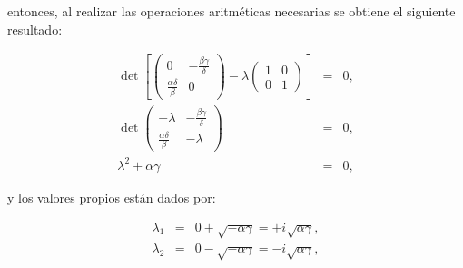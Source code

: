 \documentclass[letterpaper,11pt]{article}
\begin{document}
entonces, al realizar las operaciones aritm\'{e}ticas necesarias se obtiene
el siguiente resultado:

\begin{eqnarray*}
\det \left[ \left( 
\begin{array}{cc}
0 & -\frac{\beta \gamma }{\delta } \\ 
\frac{\alpha \delta }{\beta } & 0%
\end{array}%
\right) -\lambda \left( 
\begin{array}{cc}
1 & 0 \\ 
0 & 1%
\end{array}%
\right) \right]  &=&0, \\
\det \left( 
\begin{array}{cc}
-\lambda  & -\frac{\beta \gamma }{\delta } \\ 
\frac{\alpha \delta }{\beta } & -\lambda 
\end{array}%
\right)  &=&0, \\
\lambda ^{2}+\alpha \gamma  &=&0,
\end{eqnarray*}

y los valores propios est\'{a}n dados por:

\begin{eqnarray*}
\lambda _{1} &=&0+\sqrt{-\alpha \gamma }=+i\sqrt{\alpha \gamma }, \\
\lambda _{2} &=&0-\sqrt{-\alpha \gamma }=-i\sqrt{\alpha \gamma },
\end{eqnarray*}

\bigskip 
\end{document}
